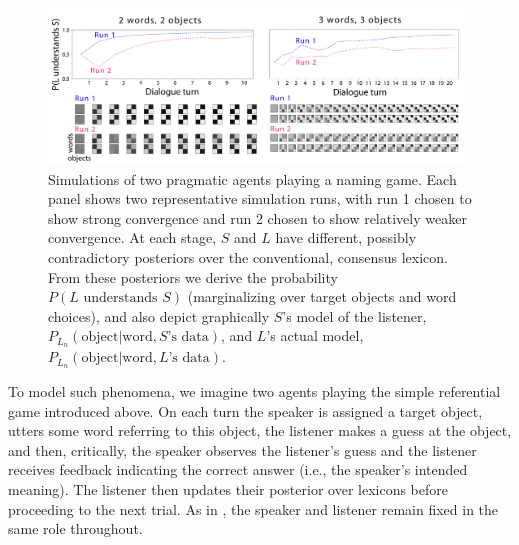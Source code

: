 \documentclass{article} %
\newcommand{\word}{\text{word}}
\newcommand{\obj}{\text{object}}
\begin{document}
\begin{figure}[t]
\centering
\includegraphics[width=0.98\textwidth]{figures/emergence-composite.pdf}
\caption{\label{fig:emergence} Simulations of two pragmatic agents
  playing a naming game. Each panel shows two representative
  simulation runs, with run 1 chosen to show strong convergence and
  run 2 chosen to show relatively weaker convergence. At each stage,
  $S$ and $L$ have different, possibly contradictory posteriors over
  the conventional, consensus lexicon. From these posteriors we derive
  the probability $P(\text{$L$ understands $S$})$ (marginalizing over
  target objects and word choices), and also depict graphically $S$'s
  model of the listener, $P_{L_n}(\obj | \word, \text{$S$'s data})$,
  and $L$'s actual model, $P_{L_n}(\obj | \word, \text{$L$'s
    data})$. }
\end{figure}

To model such phenomena, we imagine two agents playing the simple
referential game introduced above. On each turn the speaker is
assigned a target object, utters some word referring to this object,
the listener makes a guess at the object, and then, critically, the
speaker observes the listener's guess and the listener receives
feedback indicating the correct answer (i.e., the speaker's intended
meaning). The listener then updates their posterior over lexicons
before proceeding to the next trial. As in
\cite{krauss1964,clark1986}, the speaker and listener remain fixed in
the same role throughout.
\end{document}
